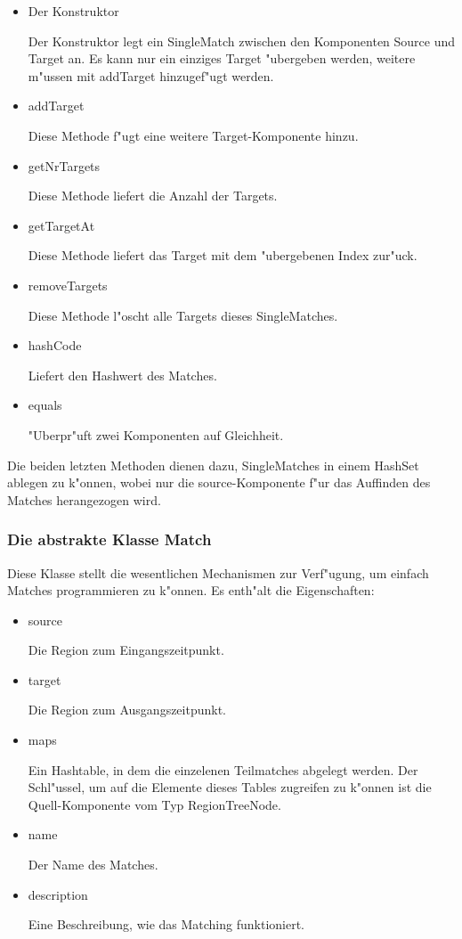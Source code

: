 \begin{itemize}
\item Der Konstruktor

Der Konstruktor legt ein SingleMatch zwischen den Komponenten Source und Target an. Es kann nur ein einziges Target "ubergeben werden, weitere m"ussen mit addTarget hinzugef"ugt werden.



\item addTarget

Diese Methode f"ugt eine weitere Target-Komponente hinzu.

\item getNrTargets

Diese Methode liefert die Anzahl der Targets.

\item getTargetAt

Diese Methode liefert das Target mit dem "ubergebenen Index zur"uck.

\item removeTargets

Diese Methode l"oscht alle Targets dieses SingleMatches.

\item hashCode

Liefert den Hashwert des Matches.

\item equals

"Uberpr"uft zwei Komponenten auf Gleichheit.

\end{itemize}

Die beiden letzten Methoden dienen dazu, SingleMatches in einem HashSet ablegen zu k"onnen, wobei nur die source-Komponente f"ur das Auffinden des Matches herangezogen wird.

\subsubsection{Die abstrakte Klasse Match}
Diese Klasse stellt die wesentlichen Mechanismen zur Verf"ugung, um einfach Matches programmieren zu k"onnen. Es enth"alt die Eigenschaften:
\begin{itemize}
\item source

Die Region zum Eingangszeitpunkt.

\item target

Die Region zum Ausgangszeitpunkt.

\item maps

Ein Hashtable, in dem die einzelenen Teilmatches abgelegt werden. Der Schl"ussel, um auf die Elemente dieses Tables zugreifen zu k"onnen ist die Quell-Komponente vom Typ RegionTreeNode.

\item name

Der Name des Matches.

\item description

Eine Beschreibung, wie das Matching funktioniert.
\end{itemize} 

